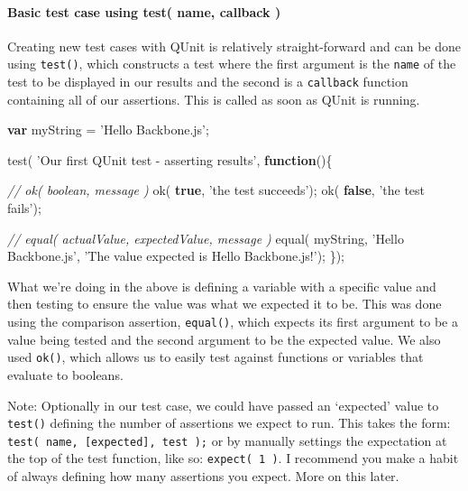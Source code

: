\documentclass[9pt]{book}
\newenvironment{Shaded}{}{}
\newcommand{\KeywordTok}[1]{\textcolor[rgb]{0.00,0.44,0.13}{\textbf{{#1}}}}
\newcommand{\StringTok}[1]{\textcolor[rgb]{0.25,0.44,0.63}{{#1}}}
\newcommand{\CommentTok}[1]{\textcolor[rgb]{0.38,0.63,0.69}{\textit{{#1}}}}
\newcommand{\FunctionTok}[1]{\textcolor[rgb]{0.02,0.16,0.49}{{#1}}}
\newcommand{\NormalTok}[1]{{#1}}
\begin{document}
\paragraph{Basic test case using test( name, callback
)}\label{basic-test-case-using-test-name-callback}

Creating new test cases with QUnit is relatively straight-forward and
can be done using \texttt{test()}, which constructs a test where the
first argument is the \texttt{name} of the test to be displayed in our
results and the second is a \texttt{callback} function containing all of
our assertions. This is called as soon as QUnit is running.

\begin{Shaded}
\begin{Highlighting}[]
\KeywordTok{var} \NormalTok{myString = }\StringTok{'Hello Backbone.js'}\NormalTok{;}

\FunctionTok{test}\NormalTok{( }\StringTok{'Our first QUnit test - asserting results'}\NormalTok{, }\KeywordTok{function}\NormalTok{()\{}

    \CommentTok{// ok( boolean, message )}
    \FunctionTok{ok}\NormalTok{( }\KeywordTok{true}\NormalTok{, }\StringTok{'the test succeeds'}\NormalTok{);}
    \FunctionTok{ok}\NormalTok{( }\KeywordTok{false}\NormalTok{, }\StringTok{'the test fails'}\NormalTok{);}

    \CommentTok{// equal( actualValue, expectedValue, message )}
    \FunctionTok{equal}\NormalTok{( myString, }\StringTok{'Hello Backbone.js'}\NormalTok{, }\StringTok{'The value expected is Hello Backbone.js!'}\NormalTok{);}
\NormalTok{\});}
\end{Highlighting}
\end{Shaded}

What we're doing in the above is defining a variable with a specific
value and then testing to ensure the value was what we expected it to
be. This was done using the comparison assertion, \texttt{equal()},
which expects its first argument to be a value being tested and the
second argument to be the expected value. We also used \texttt{ok()},
which allows us to easily test against functions or variables that
evaluate to booleans.

Note: Optionally in our test case, we could have passed an `expected'
value to \texttt{test()} defining the number of assertions we expect to
run. This takes the form: \texttt{test( name, {[}expected{]}, test );}
or by manually settings the expectation at the top of the test function,
like so: \texttt{expect( 1 )}. I recommend you make a habit of always
defining how many assertions you expect. More on this later.
\end{document}
